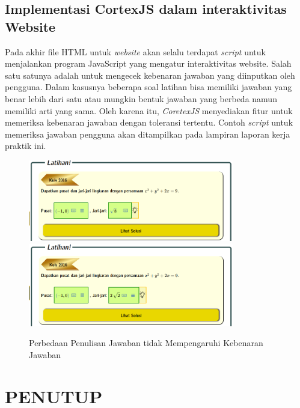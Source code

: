 \documentclass{file/KP-ITS}
\theoremstyle{definition}
\theoremstyle{definition}
\theoremstyle{plain}
\begin{document}
\section{Implementasi CortexJS dalam interaktivitas Website}
Pada akhir file HTML untuk \textit{website} akan selalu terdapat \textit{script} untuk menjalankan program JavaScript yang mengatur interaktivitas website. Salah satu satunya adalah untuk mengecek kebenaran jawaban yang diinputkan oleh pengguna. Dalam kasusnya beberapa soal latihan bisa memiliki jawaban yang benar lebih dari satu atau mungkin bentuk jawaban yang berbeda namun memiliki arti yang sama. Oleh karena itu, \textit{CoretexJS} menyediakan fitur untuk memeriksa kebenaran jawaban dengan toleransi tertentu. Contoh \textit{script} untuk memeriksa jawaban pengguna akan ditampilkan pada lampiran laporan kerja praktik ini.

\begin{figure}[h!]
    \centering
    \includegraphics[width=0.8\textwidth]{foto/JawabanBenar1.png}
    \includegraphics[width=0.8\textwidth]{foto/JawabanBenar2.png}
    \caption{Perbedaan Penulisan Jawaban tidak Mempengaruhi Kebenaran Jawaban}
\end{figure}


\chapter{PENUTUP}
\end{document}
